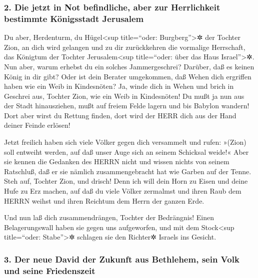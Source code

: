 \hypertarget{die-jetzt-in-not-befindliche-aber-zur-herrlichkeit-bestimmte-kuxf6nigsstadt-jerusalem}{%
\subsubsection{2. Die jetzt in Not befindliche, aber zur Herrlichkeit
bestimmte Königsstadt
Jerusalem}\label{die-jetzt-in-not-befindliche-aber-zur-herrlichkeit-bestimmte-kuxf6nigsstadt-jerusalem}}

 Du aber, Herdenturm, du Hügel\textless sup title=``oder:
Burgberg''\textgreater✲ der Tochter Zion, an dich wird gelangen und zu
dir zurückkehren die vormalige Herrschaft, das Königtum der Tochter
Jerusalem\textless sup title=``oder: über das Haus
Israel''\textgreater✲.  Nun aber, warum erhebst du ein
solches Jammergeschrei? Darüber, daß es keinen König in dir gibt? Oder
ist dein Berater umgekommen, daß Wehen dich ergriffen haben wie ein Weib
in Kindesnöten?  Ja, winde dich in Wehen und brich in
Geschrei aus, Tochter Zion, wie ein Weib in Kindesnöten! Du mußt ja nun
aus der Stadt hinausziehen, mußt auf freiem Felde lagern und bis Babylon
wandern! Dort aber wirst du Rettung finden, dort wird der HERR dich aus
der Hand deiner Feinde erlösen!

Jetzt freilich haben sich viele Völker gegen dich
versammelt und rufen: »(Zion) soll entweiht werden, auf daß unser Auge
sich an seinem Schicksal weide!« Aber sie kennen die
Gedanken des HERRN nicht und wissen nichts von seinem Ratschluß, daß er
sie nämlich zusammengebracht hat wie Garben auf der Tenne.
Steh auf, Tochter Zion, und drisch! Denn ich will dein
Horn zu Eisen und deine Hufe zu Erz machen, auf daß du viele Völker
zermalmst und ihren Raub dem HERRN weihst und ihren Reichtum dem Herrn
der ganzen Erde.

Und nun laß dich zusammendrängen, Tochter der Bedrängnis!
Einen Belagerungswall haben sie gegen uns aufgeworfen, und mit dem
Stock\textless sup title=``oder: Stabe''\textgreater✲ schlagen sie den
Richter✲ Israels ins Gesicht.

\hypertarget{der-neue-david-der-zukunft-aus-bethlehem-sein-volk-und-seine-friedenszeit}{%
\subsubsection{3. Der neue David der Zukunft aus Bethlehem, sein Volk
und seine
Friedenszeit}\label{der-neue-david-der-zukunft-aus-bethlehem-sein-volk-und-seine-friedenszeit}}

